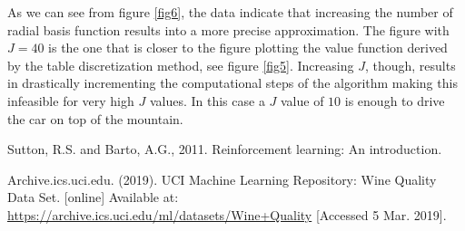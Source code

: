 \documentclass[runningheads]{llncs}
\begin{document}
As we can see from figure \ref{fig6}, the data indicate that
increasing the number of radial basis function results into a more
precise approximation. The figure with $J = 40$ is the one that is
closer to the figure plotting the value function derived by the table
discretization method, see figure \ref{fig5}. Increasing $J$,
though, results in drastically incrementing the computational steps of the
algorithm making this infeasible for very high $J$ values. In this
case a $J$ value of $10$ is enough to drive the car on top of the
mountain. 


\begin{thebibliography}{8}

Sutton, R.S. and Barto, A.G., 2011. Reinforcement learning: An introduction.

Archive.ics.uci.edu. (2019). UCI Machine Learning Repository: Wine Quality Data Set. [online] Available at: \url{https://archive.ics.uci.edu/ml/datasets/Wine+Quality} [Accessed 5 Mar. 2019].

\end{thebibliography}
\end{document}
